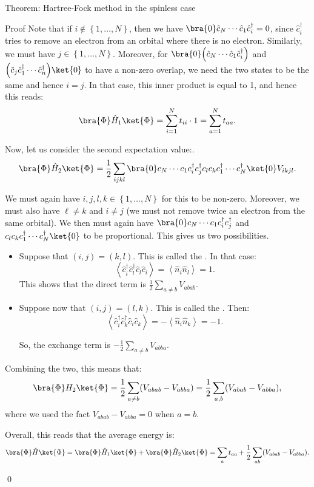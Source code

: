\documentclass[a4paper]{article}
\begin{document}
\begin{parag}{Theorem: Hartree-Fock method in the spinless case}
\begin{subparag}{Proof}
        Note that if $i \not\in \left\{1, \ldots, N\right\}$, then we have $\bra{0} \hat{c}_N \cdots \hat{c}_1 \hat{c}_i^{\dagger} = 0$, since $\hat{c}_i^{\dagger}$ tries to remove an electron from an orbital where there is no electron. Similarly, we must have $j \in \left\{1, \ldots, N\right\}$. Moreover, for $\bra{0} \left(\hat{c}_N \cdots \hat{c}_1 \hat{c}_i^{\dagger}\right)$ and $\left(\hat{c}_j \hat{c}_1^{\dagger} \cdots \hat{c}_n^{\dagger}\right) \ket{0}$ to have a non-zero overlap, we  need the two states to be the same and hence $i = j$. In that case, this inner product is equal to 1, and hence this reads: 
        \[\bra{\Phi} \hat{H}_1 \ket{\Phi} = \sum_{i = 1}^N t_{i i} \cdot 1 = \sum_{a=1}^{N} t_{aa}.\]

        Now, let us consider the second expectation value:.
        \[\bra{\Phi} \hat{H}_2 \ket{\Phi} = \frac{1}{2} \sum_{ijkl} \bra{0} c_N \cdots c_1 c_i^{\dagger} c_j^{\dagger} c_l c_k c_1^{\dagger} \cdots c_N^{\dagger} \ket{0} V_{ikjl}.\]

        We must again have $i, j, l,k \in \left\{1, \ldots, N\right\}$ for this to be non-zero. Moreover, we must also have $\ell \neq k$ and $i \neq j$ (we must not remove twice an electron from the same orbital). We then must again have $\bra{0} c_N \cdots c_1 c_i^{\dagger} c_j^{\dagger}$ and $c_l c_k c_1^{\dagger} \cdots c_N^{\dagger} \ket{0}$ to be proportional. This gives us two possibilities.
        \begin{itemize}[left=0pt]
            \item Suppose that $\left(i,j \right) = \left(k, l\right)$. This is called the . In that case:
            \[\left\langle \hat{c}_i^{\dagger} \hat{c}_l^{\dagger} \hat{c}_l \hat{c}_i \right\rangle = \left\langle \hat{n}_i \hat{n}_l \right\rangle = 1.\]
            This shows that the direct term is $\frac{1}{2} \sum_{a \neq b} V_{abab}$.

            \item Suppose now that $\left(i, j\right) = \left(l,k\right)$. This is called the .  Then:
            \[\left\langle \hat{c}_i^{\dagger} \hat{c}_k^{\dagger} \hat{c}_i \hat{c}_k \right\rangle = -\left\langle \hat{n}_i \hat{n}_k \right\rangle = -1.\]

            So, the exchange term is $-\frac{1}{2} \sum_{a \neq b} V_{abba}$.
        \end{itemize}

        Combining the two, this means that:
        \[\bra{\Phi} H_2 \ket{\Phi} = \frac{1}{2} \sum_{a \neq b} \left(V_{abab} - V_{abba}\right) = \frac{1}{2} \sum_{a, b} \left(V_{abab} - V_{abba}\right),\]
        where we used the fact $V_{abab} - V_{abba} = 0$ when $a = b$. 

        Overall, this reads that the average energy is: 
        \[\bra{\Phi} \hat{H} \ket{\Phi} = \bra{\Phi} \hat{H}_1 \ket{\Phi} + \bra{\Phi} \hat{H}_2 \ket{\Phi} = \sum_{a} t_{aa} + \frac{1}{2} \sum_{a b} \left(V_{abab} - V_{abba}\right).\]

        \qed
    \end{subparag}
\end{parag}
\end{document}

